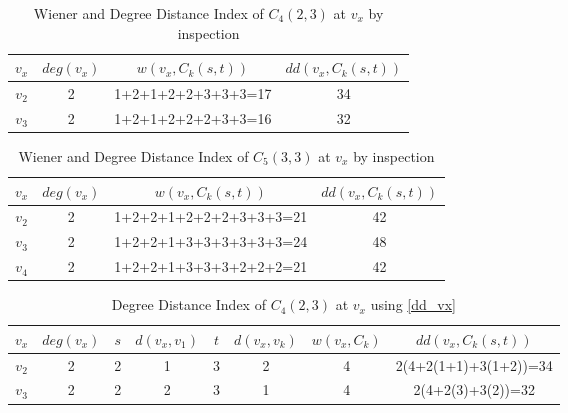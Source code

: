 \begin{table}[!ht]
\caption{Wiener and Degree Distance Index of $C_4(2,3)$ at $v_x$ by inspection}
\begin{center}
\begin{tabular}{|c|c|c|c|}
\hline 
$v_x$ & $deg(v_x)$ & $w(v_x,C_k(s,t))$ & $dd(v_x,C_k(s,t))$ \\ 
\hline 
$v_2$ & 2 & 1+2+1+2+2+3+3+3=17 & 34 \\ 
\hline 
$v_3$ & 2 & 1+2+1+2+2+2+3+3=16 & 32 \\ 
\hline 
\end{tabular} 
\end{center}
\label{tab:vx_mg1}
\end{table}

\begin{table}[!ht]
\caption{Wiener and Degree Distance Index of $C_5(3,3)$ at $v_x$ by inspection}
\begin{center}
\begin{tabular}{|c|c|c|c|}
\hline 
$v_x$ & $deg(v_x)$ & $w(v_x,C_k(s,t))$ & $dd(v_x,C_k(s,t))$ \\ 
\hline 
$v_2$ & 2 & 1+2+2+1+2+2+2+3+3+3=21 & 42 \\ 
\hline 
$v_3$ & 2 & 1+2+2+1+3+3+3+3+3+3=24 & 48 \\ 
\hline 
$v_4$ & 2 & 1+2+2+1+3+3+3+2+2+2=21 & 42 \\ 
\hline 
\end{tabular} 
\end{center}
\label{tab:vx_mg2}
\end{table}

\begin{table}[!ht]
\caption{Degree Distance Index of $C_4(2,3)$ at $v_x$ using \ref{dd_vx}}
\begin{center}
\begin{tabular}{|c|c|c|c|c|c|c|c|}
\hline 
$v_x$ & $deg(v_x)$ & $s$ & $d(v_x,v_1)$ & $t$ & $d(v_x,v_k)$ & $w(v_x,C_k)$ & $dd(v_x,C_k(s,t))$ \\ 
\hline 
$v_2$ & 2 & 2 & 1 & 3 & 2 & 4 & 2(4+2(1+1)+3(1+2))=34 \\ 
\hline 
$v_3$ & 2 & 2 & 2 & 3 & 1 & 4 & 2(4+2(3)+3(2))=32 \\ 
\hline 
\end{tabular} 
\end{center}
\label{tab:v_x_mg1_form}
\end{table}

